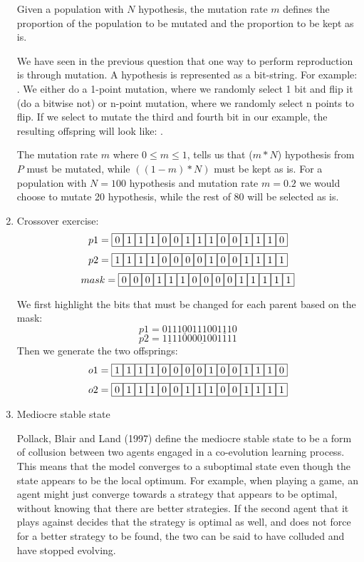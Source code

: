 \documentclass[12pt,a4paper]{article}
\begin{document}
\begin{enumerate}[label=(\alph*)]
		Given a population with $N$ hypothesis, the mutation rate $m$ defines the proportion of the population to be mutated and the proportion to be kept as is.
		
		We have seen in the previous question that one way to perform reproduction is through mutation. A hypothesis is represented as a bit-string. For example: \fbox{0}. We either do a 1-point mutation, where we randomly select 1 bit and flip it (do a bitwise not) or n-point mutation, where we randomly select n points to flip. If we select to mutate the third and fourth bit in our example, the resulting offspring will look like:  \fbox{0}\fbox{0}.
		
		The mutation rate $m$ where $0\leq m\leq 1$, tells us that ($m*N$) hypothesis from $P$ must be mutated, while $((1-m)*N)$ must be kept as is. For a population with $N = 100$ hypothesis and mutation rate $m = 0.2$ we would choose to mutate 20 hypothesis, while the rest of 80 will be selected as is.
		\item Crossover exercise:
\[ p1 = \fbox{1}\fbox{1}\fbox{1}\fbox{0}\fbox{0}\fbox{1}\fbox{1}\fbox{1}\fbox{0}\fbox{0}\fbox{1}\fbox{1}\fbox{1}\fbox{0}\]
\[ p2 = \fbox{1}\fbox{1}\fbox{1}\fbox{1}\fbox{0}\fbox{0}\fbox{0}\fbox{0}\fbox{1}\fbox{0}\fbox{0}\fbox{1}\fbox{1}\fbox{1}\fbox{1}\]
\[ mask = \fbox{0}\fbox{0}\fbox{0}\fbox{1}\fbox{1}\fbox{1}\fbox{0}\fbox{0}\fbox{0}\fbox{0}\fbox{1}\fbox{1}\fbox{1}\fbox{1}\fbox{1}\]

		We first highlight the bits that must be changed for each parent based on the mask:
		\[p1 = 011\underline{100}1110\underline{01110}\]
		\[p2 = \underline{111}100\underline{0010}01111\]
		Then we generate the two offsprings:
\[o1 = \fbox{1}\fbox{1}\fbox{1}\fbox{1}\fbox{0}\fbox{0}\fbox{0}\fbox{0}\fbox{1}\fbox{0}\fbox{0}\fbox{1}\fbox{1}\fbox{1}\fbox{0}\]
\[o2 = \fbox{0}\fbox{1}\fbox{1}\fbox{1}\fbox{0}\fbox{0}\fbox{1}\fbox{1}\fbox{1}\fbox{0}\fbox{0}\fbox{1}\fbox{1}\fbox{1}\fbox{1}\]
		
		\item Mediocre stable state
		
		Pollack, Blair and Land (1997)\cite{coevolution} define the mediocre stable state to be a form of collusion between two agents engaged in a co-evolution learning process. This means that the model converges to a suboptimal state even though the state appears to be the local optimum. For example, when playing a game, an agent might just converge towards a strategy that appears to be optimal, without knowing that there are better strategies. If the second agent that it plays against decides that the strategy is optimal as well, and does not force for a better strategy to be found, the two can be said to have colluded and have stopped evolving.
		

\end{enumerate}
\end{document}
